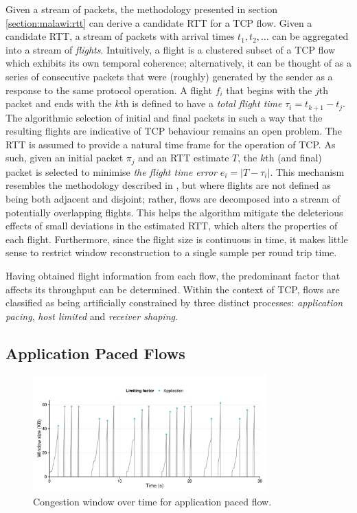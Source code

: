 Given a stream of packets, the methodology presented in section \ref{section:malawi:rtt} can derive a candidate \ac{RTT} for a \ac{TCP} flow.
Given a candidate \ac{RTT}, a stream of packets with arrival times $t_1, t_2, \ldots$ can be aggregated into a stream of \emph{flights}. 
Intuitively, a flight is a clustered subset of a \ac{TCP} flow which exhibits its own temporal coherence; alternatively, it can be thought of as a series of consecutive packets that were (roughly) generated by the sender as a response to the same protocol operation. 
A flight $f_i$ that begins with the $j$th packet and ends with the $k$th is defined to have a \emph{total flight time} $\tau_i = t_{k+1} - t_j$. 
The algorithmic selection of initial and final packets in such a way that the resulting flights are indicative of \ac{TCP} behaviour remains an open problem. 
The \ac{RTT} is assumed to provide a natural time frame for the operation of \ac{TCP}.
As such, given an initial packet $\pi_j$ and an \ac{RTT} estimate $T$, the $k$th (and final) packet is selected to minimise \emph{the flight time error} $e_i = |T - \tau_i|$. 
This mechanism resembles the methodology described in \cite{Zhang:2002p85}, but where flights are not defined as being both adjacent and disjoint; rather, flows are decomposed into a stream of potentially overlapping flights. 
This helps the algorithm mitigate the deleterious effects of small deviations in the estimated \ac{RTT}, which alters the properties of each flight. 
Furthermore, since the flight size is continuous in time, it makes little sense to restrict window reconstruction to a single sample per round trip time.

Having obtained flight information from each flow, the predominant factor that affects its throughput can be determined.
Within the context of \ac{TCP}, flows are classified as being artificially constrained by three distinct processes: \emph{application pacing}, \emph{host limited} and \emph{receiver shaping}.


\subsection{Application Paced Flows}
\label{section:rate:app}

\begin{figure}
\centering
  \includegraphics[width=0.8\textwidth]{figures/malawi/youtube.pdf}
  \caption{Congestion window over time for application paced flow. \label{fig:youtube}}
\end{figure}

